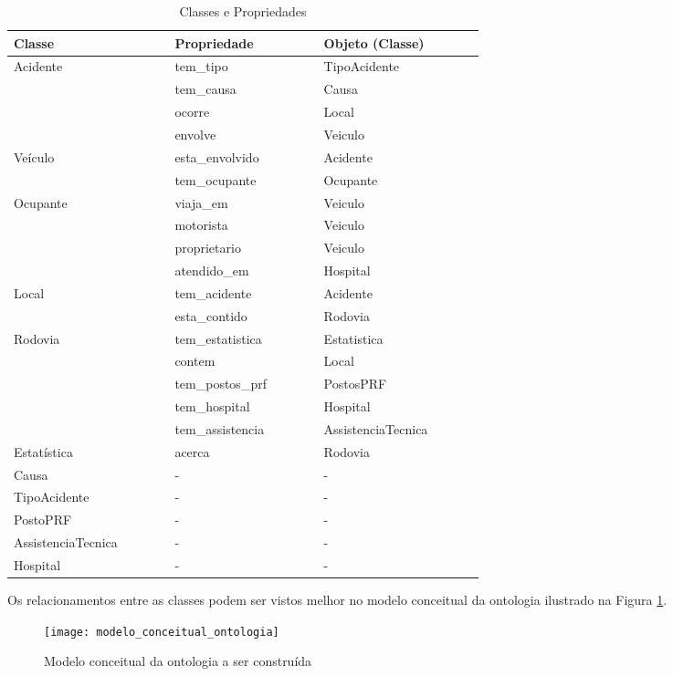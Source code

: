 	  \begin{table*}[!h]
	  \centering
	  \begin{tabular}{p{0.2\linewidth}p{0.20\linewidth}p{0.20\linewidth}}
	    \hline
	    \textbf{Classe} & \textbf{Propriedade} & \textbf{Objeto (Classe)}\\
	    \hline
	      Acidente & tem\_tipo & TipoAcidente\\
		& tem\_causa & Causa\\
		& ocorre & Local\\
		& envolve & Veiculo\\
	    \hline
	      Veículo & esta\_envolvido & Acidente\\
		& tem\_ocupante & Ocupante\\
	    \hline
	      Ocupante & viaja\_em & Veiculo\\
		& motorista & Veiculo\\
		& proprietario & Veiculo\\
		& atendido\_em & Hospital\\
	    \hline
	      Local & tem\_acidente & Acidente\\
		& esta\_contido & Rodovia\\
	    \hline
	      Rodovia & tem\_estatistica & Estatistica\\
		& contem & Local\\
		& tem\_postos\_prf & PostosPRF\\
		& tem\_hospital & Hospital\\
		& tem\_assistencia & AssistenciaTecnica\\
	    \hline
	      Estatística & acerca & Rodovia\\
	    \hline
	      Causa & - & -\\
	    \hline
	      TipoAcidente & - & -\\
	    \hline
	      PostoPRF & - & -\\
	    \hline
	      AssistenciaTecnica & - & -\\
	    \hline
	      Hospital & - & -\\
	    \hline
	  \end{tabular}
	  \caption{Classes e Propriedades}
	  \label{tab:classes}
	  \end{table*}
	  
	  Os relacionamentos entre as classes podem ser vistos melhor no modelo conceitual da ontologia ilustrado na
	  Figura \ref{fig:modelo_conceitual_ontologia}.
	  
	  \vfill
	  \pagebreak
	  \begin{figure}[!htb]
	    \centering
	    \texttt{[image: modelo\_conceitual\_ontologia]}
	    \caption[Modelo conceitual da ontologia]{Modelo conceitual da ontologia a ser construída}
	    \label{fig:modelo_conceitual_ontologia}
	  \end{figure}
	  
